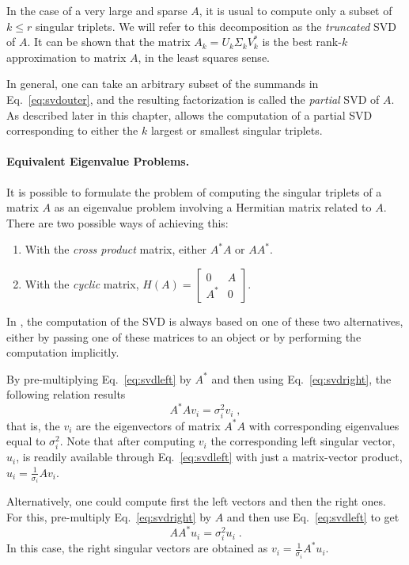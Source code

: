 In the case of a very large and sparse $A$, it is usual to compute only a subset of $k\leq r$ singular triplets. We will refer to this decomposition as the \emph{truncated} SVD of $A$. It can be shown that the matrix $A_k=U_k\Sigma_k V_k^*$ is the best rank-$k$ approximation to matrix $A$, in the least squares sense. 

In general, one can take an arbitrary subset of the summands in Eq.\ \ref{eq:svdouter}, and the resulting factorization is called the \emph{partial} SVD of $A$. As described later in this chapter, \slepc allows the computation of a partial SVD corresponding to either the $k$ largest or smallest singular triplets.

\paragraph{Equivalent Eigenvalue Problems.}

It is possible to formulate the problem of computing the singular triplets of a matrix $A$ as an eigenvalue problem involving a Hermitian matrix related to $A$. There are two possible ways of achieving this:
\begin{enumerate}
\item With the \emph{cross product} matrix, either $A^*A$ or $AA^*$.
\item With the \emph{cyclic} matrix, $H(A)=\left[\begin{smallmatrix}0&A\\A^*&0\end{smallmatrix}\right]$.
\end{enumerate}
In \slepc, the computation of the SVD is always based on one of these two alternatives, either by passing one of these matrices to an  object or by performing the computation implicitly.

By pre-multiplying Eq.\ \ref{eq:svdleft} by $A^*$ and then using Eq.\ \ref{eq:svdright}, the following relation results
\begin{equation}
\label{eq:eigleft}
A^*Av_i=\sigma_i^2v_i\;,
\end{equation}
that is, the $v_i$ are the eigenvectors of matrix $A^*A$ with corresponding eigenvalues equal to $\sigma_i^2$. Note that after computing $v_i$ the corresponding left singular vector, $u_i$, is readily available through Eq.\ \ref{eq:svdleft} with just a matrix-vector product, $u_i=\frac{1}{\sigma_i}Av_i$.

Alternatively, one could compute first the left vectors and then the right ones. For this, pre-multiply Eq.\ \ref{eq:svdright} by $A$ and then use Eq.\ \ref{eq:svdleft} to get
\begin{equation}
\label{eq:eigright}
AA^*u_i=\sigma_i^2u_i\;.
\end{equation}
In this case, the right singular vectors are obtained as $v_i=\frac{1}{\sigma_i}A^*u_i$.


